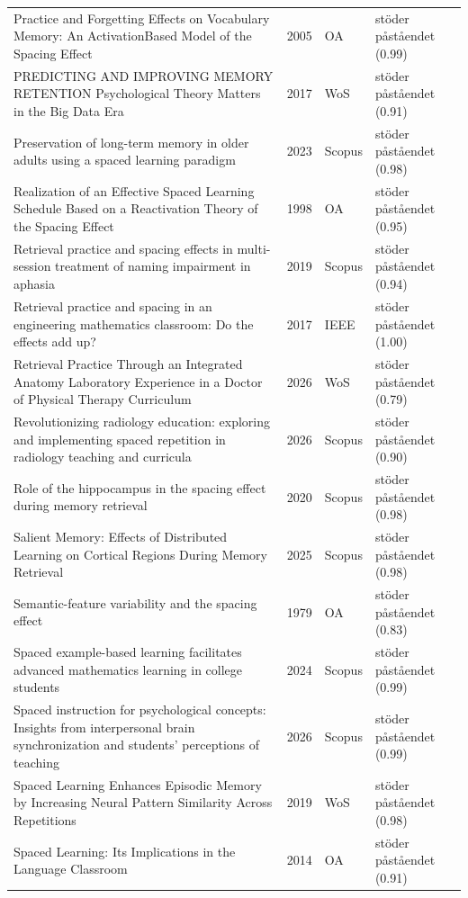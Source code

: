 \begin{longtable}{@{}%
  >{\raggedright\arraybackslash}p{}c%
  >{\raggedright\arraybackslash}p{}%
  >{\raggedright\arraybackslash}p{}@{}}
Practice and Forgetting Effects on Vocabulary Memory: An ActivationBased Model of the Spacing Effect & 2005 & OA & stöder påståendet (0.99) \\
PREDICTING AND IMPROVING MEMORY RETENTION Psychological Theory Matters in the Big Data Era & 2017 & WoS & stöder påståendet (0.91) \\
Preservation of long-term memory in older adults using a spaced learning paradigm & 2023 & Scopus & stöder påståendet (0.98) \\
Realization of an Effective Spaced Learning Schedule Based on a Reactivation Theory of the Spacing Effect & 1998 & OA & stöder påståendet (0.95) \\
Retrieval practice and spacing effects in multi-session treatment of naming impairment in aphasia & 2019 & Scopus & stöder påståendet (0.94) \\
Retrieval practice and spacing in an engineering mathematics classroom: Do the effects add up? & 2017 & IEEE & stöder påståendet (1.00) \\
Retrieval Practice Through an Integrated Anatomy Laboratory Experience in a Doctor of Physical Therapy Curriculum & 2026 & WoS & stöder påståendet (0.79) \\
Revolutionizing radiology education: exploring and implementing spaced repetition in radiology teaching and curricula & 2026 & Scopus & stöder påståendet (0.90) \\
Role of the hippocampus in the spacing effect during memory retrieval & 2020 & Scopus & stöder påståendet (0.98) \\
Salient Memory: Effects of Distributed Learning on Cortical Regions During Memory Retrieval & 2025 & Scopus & stöder påståendet (0.98) \\
Semantic-feature variability and the spacing effect & 1979 & OA & stöder påståendet (0.83) \\
Spaced example-based learning facilitates advanced mathematics learning in college students & 2024 & Scopus & stöder påståendet (0.99) \\
Spaced instruction for psychological concepts: Insights from interpersonal brain synchronization and students' perceptions of teaching & 2026 & Scopus & stöder påståendet (0.99) \\
Spaced Learning Enhances Episodic Memory by Increasing Neural Pattern Similarity Across Repetitions & 2019 & WoS & stöder påståendet (0.98) \\
Spaced Learning: Its Implications in the Language Classroom & 2014 & OA & stöder påståendet (0.91) \\

\end{longtable}
